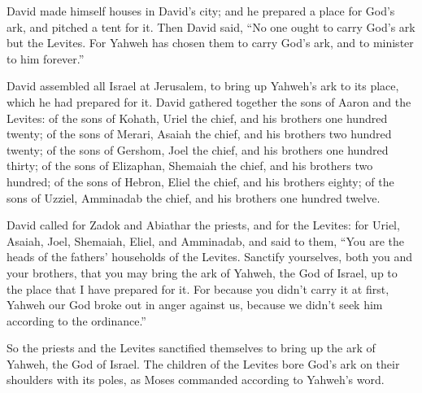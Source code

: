  David made himself houses in David's city; and he
prepared a place for God's ark, and pitched a tent for it.
 Then David said, ``No one ought to carry God's ark but
the Levites. For Yahweh has chosen them to carry God's ark, and to
minister to him forever.''

 David assembled all Israel at Jerusalem, to bring up
Yahweh's ark to its place, which he had prepared for it. 
David gathered together the sons of Aaron and the Levites:
 of the sons of Kohath, Uriel the chief, and his brothers
one hundred twenty;  of the sons of Merari, Asaiah the
chief, and his brothers two hundred twenty;  of the sons
of Gershom, Joel the chief, and his brothers one hundred thirty;
 of the sons of Elizaphan, Shemaiah the chief, and his
brothers two hundred;  of the sons of Hebron, Eliel the
chief, and his brothers eighty;  of the sons of Uzziel,
Amminadab the chief, and his brothers one hundred twelve.

 David called for Zadok and Abiathar the priests, and for
the Levites: for Uriel, Asaiah, Joel, Shemaiah, Eliel, and Amminadab,
 and said to them, ``You are the heads of the fathers'
households of the Levites. Sanctify yourselves, both you and your
brothers, that you may bring the ark of Yahweh, the God of Israel, up to
the place that I have prepared for it.  For because you
didn't carry it at first, Yahweh our God broke out in anger against us,
because we didn't seek him according to the ordinance.''

 So the priests and the Levites sanctified themselves to
bring up the ark of Yahweh, the God of Israel.  The
children of the Levites bore God's ark on their shoulders with its
poles, as Moses commanded according to Yahweh's word.

